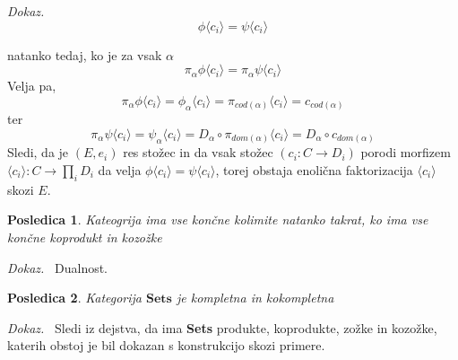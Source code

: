\documentclass[12pt,a4paper]{book}
\theoremstyle{definition}
\theoremstyle{plain}
\newtheorem{posledica}{Posledica}[definicija]
\newenvironment{dokaz}{\emph{Dokaz.}\ }{\hspace{\fill}{$\Box$}}
\theoremstyle{definition}
\theoremstyle{remark}
\newcommand{\cat}[1]{\textbf{#1}}
\begin{document}
\begin{dokaz}
$$\phi \langle c_i \rangle = \psi \langle c_i \rangle $$

natanko tedaj, ko je za vsak $\alpha$
$$ \pi_\alpha \phi \langle c_i \rangle = \pi_\alpha \psi \langle c_i \rangle $$
Velja pa,
$$ \pi_\alpha \phi \langle c_i \rangle = \phi_\alpha \langle c_i \rangle = \pi_{cod(\alpha)}\langle c_i \rangle = c_{cod(\alpha)} $$
ter
$$ \pi_\alpha \psi \langle c_i \rangle = \psi_\alpha \langle c_i \rangle  = D_\alpha \circ \pi_{dom(\alpha)} \langle c_i \rangle = D_\alpha \circ c_{dom(\alpha)} $$
Sledi, da je $(E, e_i)$ res stožec in da vsak stožec $(c_i : C \to D_i)$ porodi morfizem $\langle c_i \rangle : C \to \prod_i D_i$ da velja $\phi\langle c_i \rangle = \psi \langle c_i \rangle$, torej obstaja enolična faktorizacija $\langle c_i \rangle$ skozi $E$.

\end{dokaz}

\begin{posledica}
Kateogrija ima vse končne kolimite natanko takrat, ko ima vse končne koprodukt in kozožke
\end{posledica}
\begin{dokaz}
Dualnost.
\end{dokaz}

\begin{posledica}
Kategorija $\cat{Sets}$ je kompletna in kokompletna
\end{posledica}
\begin{dokaz}
Sledi iz dejstva, da ima \cat{Sets} produkte, koprodukte, zožke in kozožke, katerih obstoj je bil dokazan s konstrukcijo skozi primere.
\end{dokaz}
\end{document}
